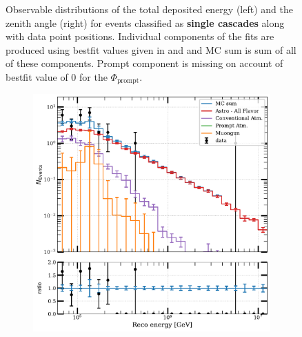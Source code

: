 \begin{figure}[h]
\begin{subfigure}[h]{0.7\textwidth}
    \end{subfigure}%
    \caption{Observable distributions of the total deposited energy (left) and the zenith angle (right) for events classified as \textbf{single cascades} along with data point positions. Individual components of the fits are produced using bestfit values given in  and  and MC sum is sum of all of these components. Prompt component is missing on account of bestfit value of 0 for the $\Phi_{\mathrm{prompt}}$.}
\end{figure}

\begin{figure}[h!]
    \begin{subfigure}[h]{0.7\textwidth}
        \includegraphics{./figures/results/DataMC_IC86_pass2_SnowStorm_v2_Bfr_Tracks_energy.pdf}
    \end{subfigure}
    \hfill
    \begin{subfigure}[h]{0.7\textwidth}

\end{subfigure}
\end{figure}
